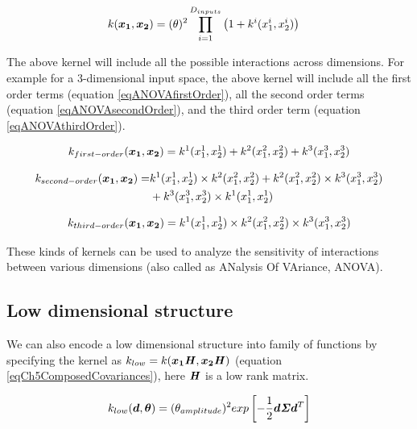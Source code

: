 \begin{align}
k(\boldsymbol{x_{1}}, \boldsymbol{x_{2}}) & = (\theta)^2 \prod_{i=1}^{D_{inputs}} \left(1 + k^{i}(x_{1}^{i}, x_{2}^{i})\right) \label{eqANOVAdecomposition} 
\end{align}

The above kernel will include all the possible interactions across dimensions. For example for a 3-dimensional input space, the above kernel will include all the first order terms (equation \ref{eqANOVAfirstOrder}), all the second order terms (equation \ref{eqANOVAsecondOrder}), and the third order term (equation \ref{eqANOVAthirdOrder}).


\begin{align}\label{eqANOVAfirstOrder}
k_{first-order}(\boldsymbol{x_{1}}, \boldsymbol{x_{2}}) =  k^{1}(x_{1}^{1}, x_{2}^{1}) + k^{2}(x_{1}^{2}, x_{2}^{2}) + k^{3}(x_{1}^{3}, x_{2}^{3})
\end{align}

\begin{align}\label{eqANOVAsecondOrder} 
k_{second-order}(\boldsymbol{x_{1}}, \boldsymbol{x_{2}})  = & k^{1}(x_{1}^{1}, x_{2}^{1}) \times k^{2}(x_{1}^{2}, x_{2}^{2}) + k^{2}(x_{1}^{2}, x_{2}^{2}) \times k^{3}(x_{1}^{3}, x_{2}^{3}) \\ & 
+  k^{3}(x_{1}^{3}, x_{2}^{3}) \times k^{1}(x_{1}^{1}, x_{2}^{1})     
\end{align}

\begin{align}\label{eqANOVAthirdOrder}
k_{third-order}(\boldsymbol{x_{1}}, \boldsymbol{x_{2}}) = k^{1}(x_{1}^{1}, x_{2}^{1}) \times k^{2}(x_{1}^{2}, x_{2}^{2}) \times k^{3}(x_{1}^{3}, x_{2}^{3})
\end{align}

These kinds of kernels can be used to analyze the sensitivity of interactions between various dimensions (also called as ANalysis Of VAriance, ANOVA). 

\subsection{Low dimensional structure}\label{subsec:lowDimensional}
We can also encode a low dimensional structure into family of functions by specifying the kernel as $k_{low} = k(\boldsymbol{x_{1}}\bm{\mathit{H}}, \boldsymbol{x_{2}}\bm{\mathit{H}})$ (equation \ref{eqCh5ComposedCovariances}), here $\bm{\mathit{H}}$ is a low rank matrix. 

\begin{align}\label{eq:SELowDimensional}
k_{low}(\boldsymbol{d}, \boldsymbol{\theta}) = (\theta_{amplitude})^2  exp\left [  -\frac{1}{2} \boldsymbol{d} \bm{\mathit{\Sigma}} \boldsymbol{d}^T \right ] 
\end{align}

